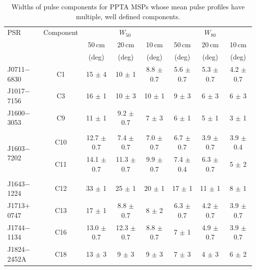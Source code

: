 \documentclass[useAMS,usenatbib]{mn2e}
\begin{document}
\begin{table}
\begin{center}
\caption{Widths of pulse components for PPTA MSPs whose mean pulse profiles have multiple, well defined components.}
\label{tableWidth2}
\begin{tabular}{lccccccc}
\hline
PSR                           & Component   &   \multicolumn{3}{c}{$W_{50}$}&  \multicolumn{3}{c}{$W_{80}$}     \\
								              &             & 50\,cm  & 20\,cm   & 10\,cm   & 50\,cm  & 20\,cm   & 10\,cm   \\
								              &             & (deg)   & (deg)    &  (deg)   &  (deg)  & (deg)    &   (deg)  \\
\hline
J0711$-$6830                  & C1   &15   $\pm$ 4   & 10   $\pm$ 1   & 8.8  $\pm$ 0.7  & 5.6  $\pm$ 0.7 & 5.3 $\pm$ 0.7 & 4.2 $\pm$ 0.7 \\ 
J1017$-$7156                  & C3   &16   $\pm$ 1   & 10   $\pm$ 3   & 10   $\pm$ 1    & 9    $\pm$ 3   & 6   $\pm$ 3   & 6   $\pm$ 3   \\ 
J1600$-$3053                  & C9   &11   $\pm$ 1   & 9.2  $\pm$ 0.7 & 7    $\pm$ 3    & 6    $\pm$ 1   & 5   $\pm$ 1   & 3   $\pm$ 1   \\ 
                              &      &               &                &                 &                &               &               \\
\multirow{2}{*}{J1603$-$7202} & C10  &12.7 $\pm$ 0.7 & 7.4  $\pm$ 0.7 & 7.0  $\pm$ 0.7  & 6.7  $\pm$ 0.7 & 3.9 $\pm$ 0.7 & 3.9 $\pm$ 0.4 \\  
                              & C11  &14.1 $\pm$ 0.7 & 11.3 $\pm$ 0.7 & 9.9  $\pm$ 0.7  & 7.4  $\pm$ 0.4 & 6.3 $\pm$ 0.7 & 5   $\pm$ 2   \\ 
                              &      &               &                &                 &                &               &               \\
J1643$-$1224                  & C12  &33   $\pm$ 1   & 25   $\pm$ 1   & 20   $\pm$ 1    & 17   $\pm$ 1   & 11  $\pm$ 1   & 8   $\pm$ 1   \\ 
J1713$+$0747                  & C13  &17   $\pm$ 1   & 8.8  $\pm$ 0.7 & 8    $\pm$ 2    & 6.3  $\pm$ 0.7 & 4.2 $\pm$ 0.7 & 3.9 $\pm$ 0.7 \\ 
J1744$-$1134                  & C16  &13.0 $\pm$ 0.7 & 12.3 $\pm$ 0.7 & 8.8  $\pm$ 0.7  & 7    $\pm$ 1   & 4.9 $\pm$ 0.7 & 3.9 $\pm$ 0.7 \\ 
J1824$-$2452A                 & C18  &13   $\pm$ 3   & 9    $\pm$ 3   & 9    $\pm$ 3    & 7    $\pm$ 3   & 4   $\pm$ 3   & 6   $\pm$ 2   \\ 

\end{tabular}
\end{center}
\end{table}
\end{document}
